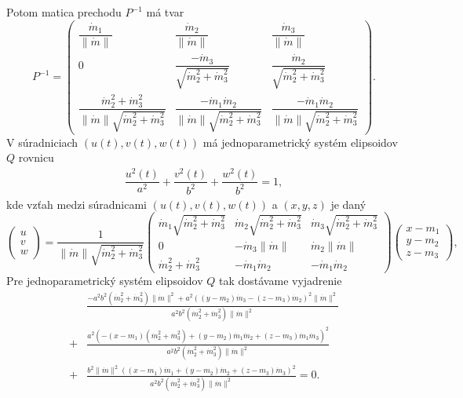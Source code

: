 Potom matica prechodu $P^{-1}$ má tvar
$$
P^{-1} = \left( \begin{matrix} \dfrac{\dot{m}_1}{\|\dot{m}\|} & \dfrac{\dot{m}_2}{\|\dot{m}\|} & \dfrac{\dot{m}_3}{\|\dot{m}\|} \\
0 & \dfrac{-\dot{m}_3}{\sqrt{\dot{m}_2^2 + \dot{m}_3^2}} & \dfrac{\dot{m}_2}{\sqrt{\dot{m}_2^2 + \dot{m}_3^2}} \\
\dfrac{\dot{m}_2^2 + \dot{m}_3^2}{\|\dot{m}\| \sqrt{\dot{m}_2^2 + \dot{m}_3^2}} & \dfrac{-\dot{m}_1 \dot{m}_2 }{\|\dot{m}\| \sqrt{\dot{m}_2^2 + \dot{m}_3^2}} &  \dfrac{-\dot{m}_1 \dot{m}_2}{ \|\dot{m}\| \sqrt{\dot{m}_2^2 + \dot{m}_3^2}} 
\end{matrix} \right).
$$
V súradniciach $(u(t),v(t),w(t))$ má jednoparametrický systém elipsoidov $Q$ rovnicu
\begin{align*}
\dfrac{u^2(t)}{a^2} + \dfrac{v^2(t)}{b^2} + \dfrac{w^2(t)}{b^2} = 1,
\end{align*}
kde vzťah medzi súradnicami $(u(t),v(t),w(t))$ a $(x,y,z)$ je daný
$$
\left(\begin{matrix}
u \\
v \\
w
\end{matrix}\right) = \frac{1}{ \| \dot{m}\| \sqrt{\dot{m}_2^2 + \dot{m}_3^2}}
\left( \begin{matrix} 
\dot{m}_1 \sqrt{\dot{m}_2^2 + \dot{m}_3^2} & \dot{m}_2 \sqrt{\dot{m}_2^2 + \dot{m}_3^2} & \dot{m}_3 \sqrt{\dot{m}_2^2 + \dot{m}_3^2} \\
0 & -\dot{m}_3 \| \dot{m}\| & \dot{m}_2 \| \dot{m}\| \\
\dot{m}_2^2 + \dot{m}_3^2 & -\dot{m}_1 \dot{m}_2 & -\dot{m}_1 \dot{m}_2 
\end{matrix} \right)
\left(\begin{matrix} x - m_1 \\ y - m_2 \\ z - m_3 \end{matrix}\right),
$$
Pre jednoparametrický systém elipsoidov $Q$ tak dostávame vyjadrenie
\begin{align*}
&\frac{- a^{2} b^{2} (\dot{m}_{2}^{2} + \dot{m}_{3}^{2}) \| \dot{m} \|^2 + a^{2} ((y - m_{2}) \dot{m}_{3} - (z - m_{3}) \dot{m}_{2})^{2} \| \dot{m} \|^2}{a^{2} b^{2} (\dot{m}_{2}^{2} + \dot{m}_{3}^{2}) \| \dot{m} \|^2} \\
+ &\frac{a^{2} (- (x - m_{1}) (\dot{m}_{2}^{2} + \dot{m}_{3}^{2}) + (y - m_{2}) \dot{m}_{1} \dot{m}_{2} + (z - m_{3}) \dot{m}_{1} \dot{m}_{3})^{2}}{a^{2} b^{2} (\dot{m}_{2}^{2} + \dot{m}_{3}^{2}) \| \dot{m} \|^2} \\
+ &\frac{b^{2} \| \dot{m} \|^2  ((x - m_{1}) \dot{m}_{1} + (y - m_{2}) \dot{m}_{2} + (z - m_{3}) \dot{m}_{3})^{2}}{a^{2} b^{2} (\dot{m}_{2}^{2} + \dot{m}_{3}^{2}) \| \dot{m} \|^2} = 0.
\end{align*}
